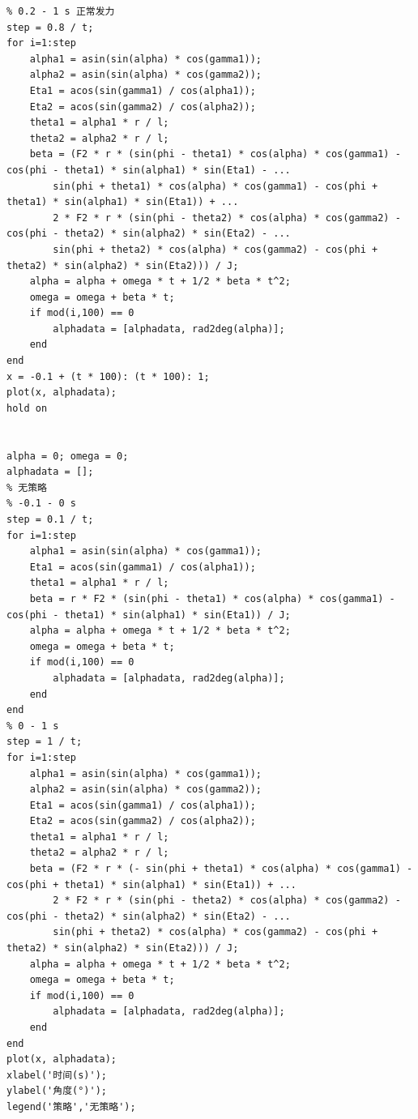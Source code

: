 \documentclass{cumcm}
\begin{document}
\begin{lstlisting}
% 0.2 - 1 s 正常发力
step = 0.8 / t;
for i=1:step
    alpha1 = asin(sin(alpha) * cos(gamma1));
    alpha2 = asin(sin(alpha) * cos(gamma2));
    Eta1 = acos(sin(gamma1) / cos(alpha1));
    Eta2 = acos(sin(gamma2) / cos(alpha2));
    theta1 = alpha1 * r / l;
    theta2 = alpha2 * r / l;
    beta = (F2 * r * (sin(phi - theta1) * cos(alpha) * cos(gamma1) - cos(phi - theta1) * sin(alpha1) * sin(Eta1) - ...
        sin(phi + theta1) * cos(alpha) * cos(gamma1) - cos(phi + theta1) * sin(alpha1) * sin(Eta1)) + ...
        2 * F2 * r * (sin(phi - theta2) * cos(alpha) * cos(gamma2) - cos(phi - theta2) * sin(alpha2) * sin(Eta2) - ...
        sin(phi + theta2) * cos(alpha) * cos(gamma2) - cos(phi + theta2) * sin(alpha2) * sin(Eta2))) / J;
    alpha = alpha + omega * t + 1/2 * beta * t^2;
    omega = omega + beta * t;
    if mod(i,100) == 0
        alphadata = [alphadata, rad2deg(alpha)];
    end
end
x = -0.1 + (t * 100): (t * 100): 1;
plot(x, alphadata);
hold on


alpha = 0; omega = 0;
alphadata = [];
% 无策略
% -0.1 - 0 s
step = 0.1 / t;
for i=1:step
    alpha1 = asin(sin(alpha) * cos(gamma1));
    Eta1 = acos(sin(gamma1) / cos(alpha1));
    theta1 = alpha1 * r / l;
    beta = r * F2 * (sin(phi - theta1) * cos(alpha) * cos(gamma1) - cos(phi - theta1) * sin(alpha1) * sin(Eta1)) / J;
    alpha = alpha + omega * t + 1/2 * beta * t^2;
    omega = omega + beta * t;
    if mod(i,100) == 0
        alphadata = [alphadata, rad2deg(alpha)];
    end
end
% 0 - 1 s
step = 1 / t;
for i=1:step
    alpha1 = asin(sin(alpha) * cos(gamma1));
    alpha2 = asin(sin(alpha) * cos(gamma2));
    Eta1 = acos(sin(gamma1) / cos(alpha1));
    Eta2 = acos(sin(gamma2) / cos(alpha2));
    theta1 = alpha1 * r / l;
    theta2 = alpha2 * r / l;
    beta = (F2 * r * (- sin(phi + theta1) * cos(alpha) * cos(gamma1) - cos(phi + theta1) * sin(alpha1) * sin(Eta1)) + ...
        2 * F2 * r * (sin(phi - theta2) * cos(alpha) * cos(gamma2) - cos(phi - theta2) * sin(alpha2) * sin(Eta2) - ...
        sin(phi + theta2) * cos(alpha) * cos(gamma2) - cos(phi + theta2) * sin(alpha2) * sin(Eta2))) / J;
    alpha = alpha + omega * t + 1/2 * beta * t^2;
    omega = omega + beta * t;
    if mod(i,100) == 0
        alphadata = [alphadata, rad2deg(alpha)];
    end
end
plot(x, alphadata);
xlabel('时间(s)');
ylabel('角度(°)');
legend('策略','无策略');
\end{lstlisting}
\end{document}
